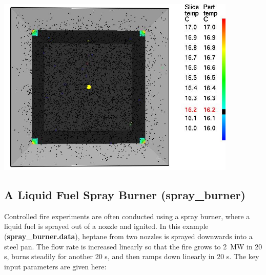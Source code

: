 \documentclass[11pt]{book}
\begin{document}
\begin{center}
\includegraphics[width=4.5in]{FIGURES/water_evaporation}
\end{center}







\clearpage

\subsection{A Liquid Fuel Spray Burner ({\bf spray\_burner}) }
\label{spray_burner}

Controlled fire experiments are often conducted using a spray burner,
where a liquid fuel is sprayed out of a nozzle and ignited. In this
example ({\bf spray\_burner.data}), heptane from two nozzles is
sprayed downwards into a steel pan.  The flow rate is increased
linearly so that the fire grows to 2~MW in 20 s, burns steadily for
another 20 s, and then ramps down linearly in 20 s. The key input
parameters are given here:
\end{document}

